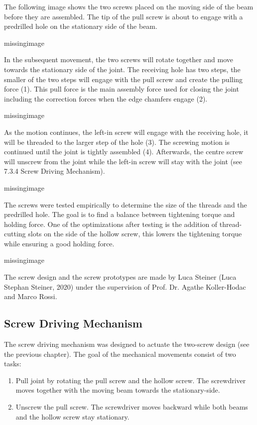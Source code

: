 The following image shows the two screws placed on the moving side of the beam before they are assembled. The tip of the pull screw is about to engage with a predrilled hole on the stationary side of the beam.

missingimage

In the subsequent movement, the two screws will rotate together and move towards the stationary side of the joint. The receiving hole has two steps, the smaller of the two steps will engage with the pull screw and create the pulling force (1). This pull force is the main assembly force used for closing the joint including the correction forces when the edge chamfers engage (2).

missingimage


As the motion continues, the left-in screw will engage with the receiving hole, it will be threaded to the larger step of the hole (3). The screwing motion is continued until the joint is tightly assembled (4). Afterwards, the centre screw will unscrew from the joint while the left-in screw will stay with the joint (see 7.3.4 Screw Driving Mechanism).

missingimage

The screws were tested empirically to determine the size of the threads and the predrilled hole. The goal is to find a balance between tightening torque and holding force. One of the optimizations after testing is the addition of thread-cutting slots on the side of the hollow screw, this lowers the tightening torque while ensuring a good holding force.

missingimage

The screw design and the screw prototypes are made by Luca Steiner (Luca Stephan Steiner, 2020) under the supervision of Prof. Dr. Agathe Koller-Hodac and Marco Rossi.

\subsection{Screw Driving Mechanism}
\label{subsection:exploration_4_screw_driving_mechanism}

The screw driving mechanism was designed to actuate the two-screw design (see the previous chapter). The goal of the mechanical movements consist of two tasks:

\begin{enumerate}
    \item Pull joint by rotating the pull screw and the hollow screw. The screwdriver moves together with the moving beam towards the stationary-side.
    \item Unscrew the pull screw. The screwdriver moves backward while both beams and the hollow screw stay stationary.
\end{enumerate}

